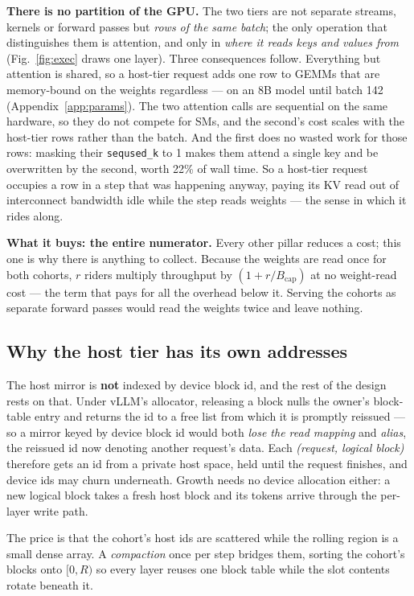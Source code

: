 \textbf{There is no partition of the GPU.} The two tiers are not separate streams,
kernels or forward passes but \emph{rows of the same batch}; the only operation that
distinguishes them is attention, and only in \emph{where it reads keys and values
from} (Fig.~\ref{fig:exec} draws one layer). Three consequences follow. Everything
but attention is shared, so a host-tier request adds one row to GEMMs that are
memory-bound on the weights regardless --- on an 8B model until batch 142
(Appendix~\ref{app:params}). The two attention calls are sequential on the same
hardware, so they do not compete for SMs, and the second's cost scales with the
host-tier rows rather than the batch. And the first does no wasted work for those
rows: masking their \texttt{seqused\_k} to 1 makes them attend a single key and be
overwritten by the second, worth 22\% of wall time. So a host-tier request occupies a
row in a step that was happening anyway, paying its KV read out of interconnect
bandwidth idle while the step reads weights --- the sense in which it rides along.

\textbf{What it buys: the entire numerator.} Every other pillar reduces a cost;
this one is why there is anything to collect. Because the weights are read once for
both cohorts, $r$ riders multiply throughput by $(1 + r/B_{\mathrm{cap}})$ at no
weight-read cost --- the term that pays for all the overhead below it. Serving the
cohorts as separate forward passes would read the weights twice and leave nothing.

\subsection{Why the host tier has its own addresses}
\label{sec:design:spaces}

The host mirror is \textbf{not} indexed by device block id, and the rest of the
design rests on that. Under vLLM's allocator, releasing a block nulls the owner's
block-table entry and returns the id to a free list from which it is promptly
reissued --- so a mirror keyed by device block id would both \emph{lose the read
mapping} and \emph{alias}, the reissued id now denoting another request's data. Each
\emph{(request, logical block)} therefore gets an id from a private host space, held
until the request finishes, and device ids may churn underneath. Growth needs no
device allocation either: a new logical block takes a fresh host block and its
tokens arrive through the per-layer write path.

The price is that the cohort's host ids are scattered while the rolling region is a
small dense array. A \emph{compaction} once per step bridges them, sorting the
cohort's blocks onto $[0,R)$ so every layer reuses one block table while the slot
contents rotate beneath it.

